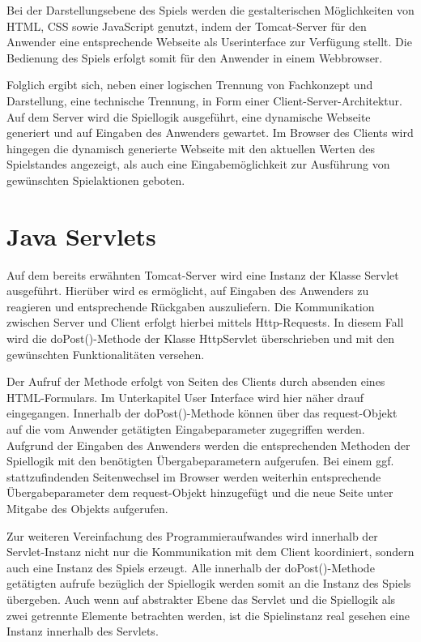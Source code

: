 Bei der Darstellungsebene des Spiels werden die gestalterischen Möglichkeiten von HTML, CSS sowie JavaScript genutzt, indem der Tomcat-Server für den Anwender eine entsprechende Webseite als Userinterface zur Verfügung stellt. Die Bedienung des Spiels erfolgt somit für den Anwender in einem Webbrowser.

Folglich ergibt sich, neben einer logischen Trennung von Fachkonzept und Darstellung, eine technische Trennung, in Form einer Client-Server-Architektur. Auf dem Server wird die Spiellogik ausgeführt, eine dynamische Webseite generiert und auf Eingaben des Anwenders gewartet. Im Browser des Clients wird hingegen die dynamisch generierte Webseite mit den aktuellen Werten des Spielstandes angezeigt, als auch eine Eingabemöglichkeit zur Ausführung von gewünschten Spielaktionen geboten.

\section{Java Servlets}
Auf dem bereits erwähnten Tomcat-Server wird eine Instanz der Klasse Servlet ausgeführt. Hierüber wird es ermöglicht, auf Eingaben des Anwenders zu reagieren und entsprechende Rückgaben auszuliefern. Die Kommunikation zwischen Server und Client erfolgt hierbei mittels Http-Requests. In diesem Fall wird die doPost()-Methode der Klasse HttpServlet überschrieben und mit den gewünschten Funktionalitäten versehen.

Der Aufruf der Methode erfolgt von Seiten des Clients durch absenden eines HTML-Formulars. Im Unterkapitel User Interface wird hier näher drauf eingegangen. Innerhalb der doPost()-Methode können über das request-Objekt auf die vom Anwender getätigten Eingabeparameter zugegriffen werden. Aufgrund der Eingaben des Anwenders werden die entsprechenden Methoden der Spiellogik mit den benötigten Übergabeparametern aufgerufen. Bei einem ggf. stattzufindenden Seitenwechsel im Browser werden weiterhin entsprechende Übergabeparameter dem request-Objekt hinzugefügt und die neue Seite unter Mitgabe des Objekts aufgerufen.

Zur weiteren Vereinfachung des Programmieraufwandes wird innerhalb der Servlet-Instanz nicht nur die Kommunikation mit dem Client koordiniert, sondern auch eine Instanz des Spiels erzeugt. Alle innerhalb der doPost()-Methode getätigten aufrufe bezüglich der Spiellogik werden somit an die Instanz des Spiels übergeben. Auch wenn auf abstrakter Ebene das Servlet und die Spiellogik als zwei getrennte Elemente betrachten werden, ist die Spielinstanz real gesehen eine Instanz innerhalb des Servlets.

